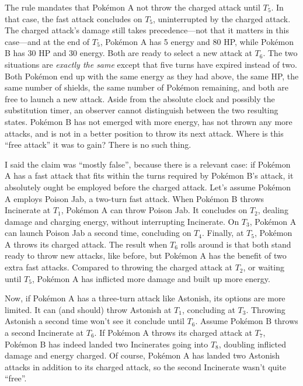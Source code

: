 The rule mandates that Pokémon A not throw the charged attack until $T_5$.
In that case, the fast attack concludes on $T_5$, uninterrupted by the charged attack.
The charged attack's damage still takes precedence---not that it matters in this case---and at the
  end of $T_5$, Pokémon A has 5 energy and 80 HP, while Pokémon B has 30 HP and 30 energy.
Both are ready to select a new attack at $T_6$.
The two situations are \textit{exactly the same} except that five turns have expired instead of two.
Both Pokémon end up with the same energy as they had above, the same HP, the same number of shields,
  the same number of Pokémon remaining, and both are free to launch a new attack.
Aside from the absolute clock and possibly the substitution timer, an observer cannot distinguish
  between the two resulting states.
Pokémon B has not emerged with more energy, has not thrown any more attacks, and is not in a better
  position to throw its next attack.
Where is this ``free attack'' it was to gain?
There is no such thing.

I said the claim was ``mostly false'', because there is a relevant case:
  if Pokémon A has a fast attack that fits within the turns required by Pokémon B's attack,
  it absolutely ought be employed before the charged attack.
Let's assume Pokémon A employs Poison Jab, a two-turn fast attack.
When Pokémon B throws Incinerate at $T_1$, Pokémon A can throw Poison Jab.
It concludes on $T_2$, dealing damage and charging energy, without interrupting Incinerate.
On $T_3$, Pokémon A can launch Poison Jab a second time, concluding on $T_4$.
Finally, at $T_5$, Pokémon A throws its charged attack.
The result when $T_6$ rolls around is that both stand ready to throw new attacks, like before,
  but Pokémon A has the benefit of two extra fast attacks.
Compared to throwing the charged attack at $T_2$, or waiting until $T_5$,
  Pokémon A has inflicted more damage and built up more energy.

Now, if Pokémon A has a three-turn attack like Astonish, its options are more limited.
It can (and should) throw Astonish at $T_1$, concluding at $T_3$.
Throwing Astonish a second time won't see it conclude until $T_6$.
Assume Pokémon B throws a second Incinerate at $T_6$.
If Pokémon A throws its charged attack at $T_7$, Pokémon B has indeed landed two Incinerates going into $T_8$,
  doubling inflicted damage and energy charged.
Of course, Pokémon A has landed two Astonish attacks in addition to its charged attack, so the
  second Incinerate wasn't quite ``free''.
